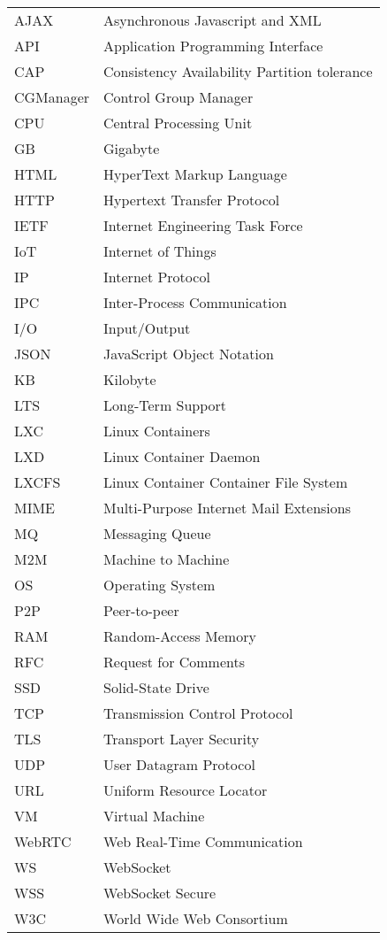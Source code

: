 \begin{longtable}{@{}p{}p{}@{}}
AJAX & Asynchronous Javascript and XML \\
API & Application Programming Interface \\
CAP & Consistency Availability Partition tolerance \\
CGManager & Control Group Manager \\
CPU & Central Processing Unit \\
GB & Gigabyte \\
HTML & HyperText Markup Language \\
HTTP & Hypertext Transfer Protocol \\
IETF & Internet Engineering Task Force \\
IoT & Internet of Things \\
IP & Internet Protocol \\
IPC & Inter-Process Communication \\
I/O & Input/Output \\
JSON & JavaScript Object Notation \\
KB & Kilobyte \\
LTS & Long-Term Support \\
LXC & Linux Containers \\
LXD & Linux Container Daemon \\
LXCFS & Linux Container Container File System \\
MIME & Multi-Purpose Internet Mail Extensions \\
MQ & Messaging Queue \\
M2M & Machine to Machine \\
OS & Operating System \\
P2P & Peer-to-peer \\
RAM & Random-Access Memory \\
RFC & Request for Comments \\
SSD & Solid-State Drive \\
TCP & Transmission Control Protocol \\
TLS & Transport Layer Security \\
UDP & User Datagram Protocol \\
URL & Uniform Resource Locator \\
VM & Virtual Machine \\
WebRTC & Web Real-Time Communication \\
WS & WebSocket \\
WSS & WebSocket Secure \\
W3C & World Wide Web Consortium \\


\end{longtable}
